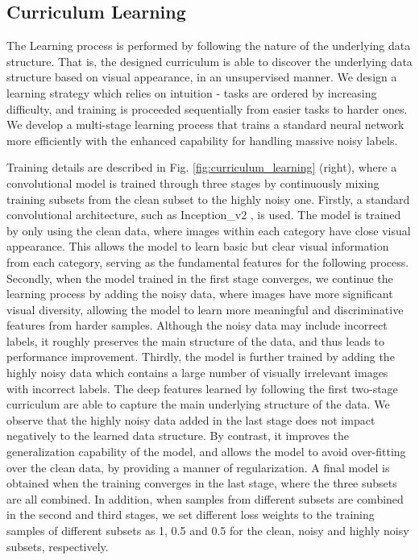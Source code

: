 \documentclass[runningheads]{llncs}
\begin{document}
\subsection{Curriculum Learning}
The Learning process is performed by following the nature of the underlying data structure. That is, the designed curriculum is able to discover the underlying data structure based on visual appearance, in an unsupervised manner. We design a learning strategy which relies on intuition - tasks are ordered by increasing difficulty, and training is proceeded sequentially from easier tasks to harder ones. We develop a multi-stage learning process that trains a standard neural network more efficiently with the enhanced capability for handling massive noisy labels.


Training details are described in Fig. \ref{fig:curriculum_learning} (right), where a convolutional model is trained through three stages by continuously mixing training subsets from the clean subset to the highly noisy one. Firstly, a standard convolutional architecture, such as Inception\_v2 \cite{ioffe2015batch}, is used. The model is trained by only using the clean data, where images within each category have close visual appearance. This allows the model to learn basic but clear visual information from each category, serving as the fundamental features for the following process. Secondly, when  the model trained in the first stage converges, we continue the learning process by adding the noisy data, where images have more significant visual diversity, allowing the model to learn more meaningful and discriminative features from harder samples. Although the noisy data may include incorrect labels, it roughly preserves the main structure of the data, and thus leads to performance improvement. Thirdly, the model is further trained by adding the highly noisy data which contains a large number of visually irrelevant images with incorrect labels. The deep features learned by following the first two-stage curriculum are able to capture the main underlying structure of the data. We observe that the highly noisy data added in the last stage does not impact negatively to the learned data structure. By contrast, it improves the generalization capability of the model, and allows the model to avoid over-fitting over the clean data, by providing a manner of regularization. A final model is obtained when the training  converges in the last stage, where the three subsets are all combined. In addition, when samples from different subsets are combined in the second and third stages, we set different loss weights to the training samples of different subsets as 1, 0.5 and 0.5 for the clean, noisy and highly noisy subsets, respectively.
\end{document}
